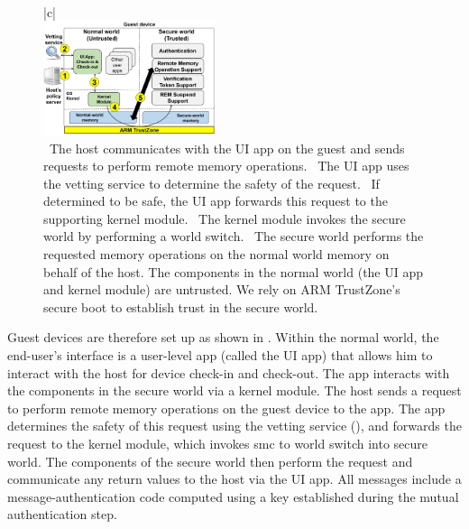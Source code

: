 \begin{figure}[t!]
\begin{center}
\begin{tabular}{|c|}
\hline
\indent\vspace{-0.3cm}\\
\includegraphics[keepaspectratio=true,width=0.45\textwidth]{figures/overall-design.png}\\
{\small \circone~The host communicates with the UI app on the guest and sends
requests to perform remote memory operations. 
%
\circtwo~The UI app uses the vetting service to determine the safety of the
request. 
%
\circthree~If determined to be safe, the UI app forwards this request to the
supporting kernel module. 
%
\circfour~The kernel module invokes the secure world by performing a world
switch. 
%
\circfive~The secure world performs the requested memory operations on the
normal world memory on behalf of the host.  The components in the normal world
(the UI app and kernel module) are untrusted. We rely on ARM TrustZone's secure
boot to establish trust in the secure world.}\\
\hline
\end{tabular}
\end{center}
\indent\vspace{-0.5cm}
\end{figure}

Guest devices are therefore set up as shown in .  Within
the normal world, the end-user's interface is a user-level app (called the UI
app) that allows him to interact with the host for device check-in and
check-out. The app interacts with the components in the secure world via a
kernel module. The host sends a request to perform remote memory operations on
the guest device to the app. The app determines the safety of this request
using the vetting service (), and forwards the request
to the kernel module, which invokes \textsf{smc} to world switch into secure
world. The components of the secure world then perform the request and
communicate any return values to the host via the UI app. All messages include
a message-authentication code computed using a key established during the
mutual authentication step.

